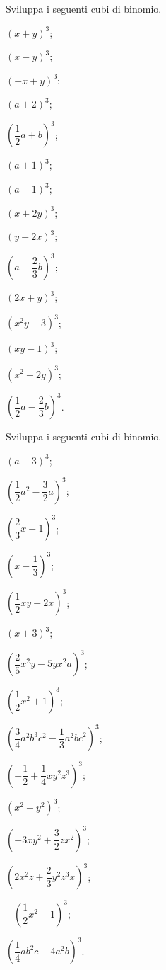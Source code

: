 \begin{esercizio}
 \label{ese:12.26}
 Sviluppa i seguenti cubi di binomio.
\begin{multicols}{3}
 \begin{enumeratea}
 \item $\left(x+y\right)^{3}$;
 \item $\left(x-y\right)^{3}$;
 \item $\left(-x+y\right)^{3}$;
 \item $\left(a+2\right)^{3}$;
 \item $\left(\dfrac{1}{2}a+b\right)^{3}$;
 \item $\left(a+1\right)^{3}$;
 \item $\left(a-1\right)^{3}$;
 \item $\left(x+2y\right)^{3}$;
 \item $\left(y-2x\right)^{3}$;
 \item $\left(a-\dfrac{2}{3}b\right)^{3}$;
 \item $\left(2x+y\right)^{3}$;
 \item $\left(x^{2}y-3\right)^{3}$;
 \item $\left(xy-1\right)^{3}$;
 \item $\left(x^{2}-2y\right)^{3}$;
 \item $\left(\dfrac{1}{2}a-\dfrac{2}{3}b\right)^{3}$.
 \end{enumeratea}
\end{multicols}
\end{esercizio}

\begin{esercizio}[\Ast]
 \label{ese:12.27}
 Sviluppa i seguenti cubi di binomio.
\begin{multicols}{3}
 \begin{enumeratea}
 \spazielenx
 \item $(a-3)^{3}$;
 \item $\left(\dfrac{1}{2}a^{2}-\dfrac{3}{2}a\right)^{3}$;
 \item $\left(\dfrac{2}{3}x-1\right)^{3}$;
 \item $\left(x-\dfrac{1}{3}\right)^{3}$;
 \item $\left(\dfrac{1}{2}{xy}-2x\right)^{3}$;
 \item $(x+3)^{3}$;
 \item $\left(\dfrac{2}{5}x^{2}y-5yx^{2}a\right)^{3}$;
 \item $\left(\dfrac{1}{2}x^{2}+1\right)^{3}$;
 \item $\left(\dfrac{3}{4}a^{2}b^{3}c^{2}-\dfrac{1}{3}a^{2}{bc}^{2}\right)^{3}$;
 \item $\left(-{\dfrac{1}{2}}+\dfrac{1}{4}{xy}^{2}z^{3}\right)^{3}$;
 \item $\left(x^{2}-y^{2}\right)^{3}$;
 \item $\left(-3xy^{2}+\dfrac{3}{2}zx^{2}\right)^{3}$;
 \item $\left(2x^{2}z+\dfrac{2}{3}y^{2}z^{3}x\right)^{3}$;
 \item $-\left(\dfrac{1}{2}x^{2}-1\right)^{3}$;
 \item $\left(\dfrac{1}{4}ab^{2}c-4a^{2}b\right)^{3}$.
 \end{enumeratea}
\end{multicols}
 \end{esercizio}

